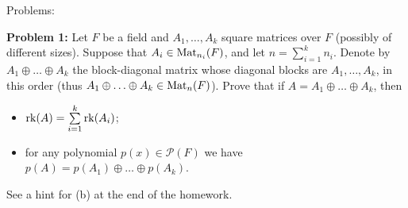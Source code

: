 \documentclass[11pt]{amsart}
\begin{document}
\bf\centerline{Problems: }\rm
\skv
{\bf Problem 1:} Let $F$ be a field and $A_1,\ldots, A_k$ square
matrices over $F$ (possibly of different sizes). Suppose that  $A_i\in {\rm Mat}_{n_i}(F)$, and
let $n=\sum\limits_{i=1}^k n_i$. Denote by $A_1\oplus\ldots\oplus A_k$ the 
block-diagonal matrix whose diagonal blocks are $A_1,\ldots, A_k$, in this order (thus $A_1\oplus\ldots\oplus A_k\in {\rm Mat}_n(F)$).
Prove that if $A=A_1\oplus\ldots\oplus A_k$, then 
\begin{itemize}
\item[(a)] ${\rm rk}(A)=\sum\limits_{i=1}^k {\rm rk}(A_i)$;
\item[(b)] for any polynomial
$p(x)\in\mathcal P(F)$ we have $p(A)=p(A_1)\oplus\ldots\oplus p(A_k)$.
\end{itemize}
See a hint for (b) at the end of the homework.
\skv
\end{document}
